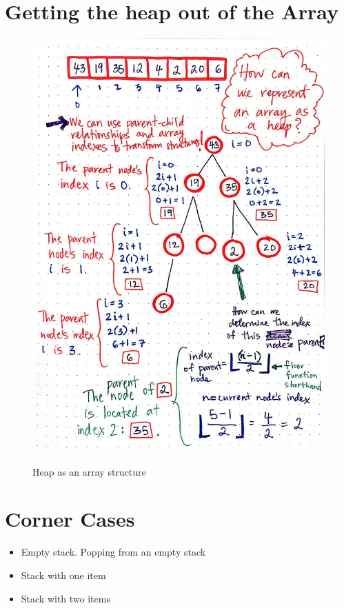 	\section{Getting the heap out of the Array}
	\begin{figure}[H]
		\centering
		\scalebox{0.40}
			{\includegraphics{images/heap_2}}
		\caption{Heap as an array structure}
	\end{figure}	

	\section{Corner Cases}
		\begin{itemize}
			\item Empty stack. Popping from an empty stack
			\item Stack with one item
			\item Stack with two items
		\end{itemize}
		
